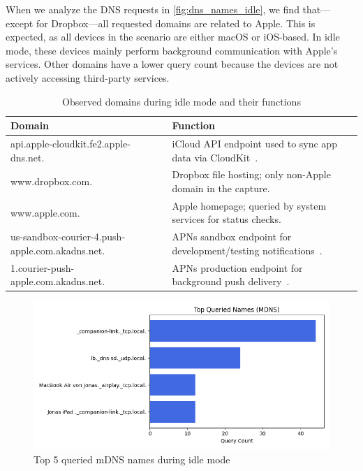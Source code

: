 \documentclass[sigconf,nonacm]{acmart}
\begin{document}
When we analyze the DNS requests in \cref{fig:dns_names_idle}, we find that—except for Dropbox—all requested domains are related to Apple. This is expected, as all devices in the scenario are either macOS or iOS-based. In idle mode, these devices mainly perform background communication with Apple’s services. Other domains have a lower query count because the devices are not actively accessing third-party services.

\begin{table}[ht]
\caption{Observed domains during idle mode and their functions}
\label{tab:dns_domains_idle}
\begin{tabular}{@{}l p{5.5cm}@{}}
\toprule
Domain & Function \\
\midrule
api.apple-cloudkit.fe2.apple-dns.net. & iCloud API endpoint used to sync app data via CloudKit~\cite{apple_cloudkit}. \\
www.dropbox.com. & Dropbox file hosting; only non-Apple domain in the capture. \\
www.apple.com. & Apple homepage; queried by system services for status checks. \\
us-sandbox-courier-4.push-apple.com.akadns.net. & APNs sandbox endpoint for development/testing notifications~\cite{stackoverflow_apns_sandbox}. \\
1.courier-push-apple.com.akadns.net. & APNs production endpoint for background push delivery~\cite{willjessiam}. \\
\bottomrule
\end{tabular}
\end{table}

\begin{figure}[htbp]
    \centering
    \includegraphics[width=\columnwidth]{images/part2/idle/top_queried_names_mdns.png}
    \caption{Top 5 queried mDNS names during idle mode}
    \label{fig:mdns_idle}
\end{figure}
\end{document}
